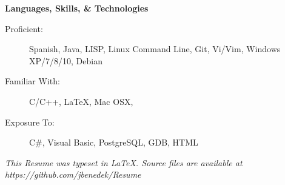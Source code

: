 \documentclass[letterpaper,11pt]{article}
\newcommand{\resheading}[1]{{\large \colorbox{mygrey}{\begin{minipage}{\textwidth}{\textbf{#1 \vphantom{p\^{E}}}}\end{minipage}}}}
\newenvironment{footer}{\par\vspace*{\fill}}{\clearpage}
\begin{document}
  
  \resheading{Languages, Skills, \& Technologies}
  \begin{description}
    \item[Proficient:] { \footnotesize 
	Spanish, Java, LISP, Linux Command Line, Git, Vi/Vim, Windows XP/7/8/10, Debian

      }
    \item[Familiar With:] { \footnotesize
	C/C++, \LaTeX, Mac OSX,
      }

    \item[Exposure To:]{\footnotesize
      C\#, Visual Basic, PostgreSQL, GDB, HTML}
  \end{description} %


  \begin{comment}
  \resheading{Projects}
  \begin{description}
    \item[Name:] { \footnotesize Description of the project here. Maybe even information on how to see the project.} 
    \item[Name:] { \footnotesize Description of the project here. Maybe even information on how to see the project.}
  \end{description}
\end{comment}

  \begin{footer}
  \begin{center}\footnotesize \textit{This Resume was typeset in \LaTeX. Source files are available at https://github.com/jbenedek/Resume} \end{center}
  \end{footer}
  
\end{document}
